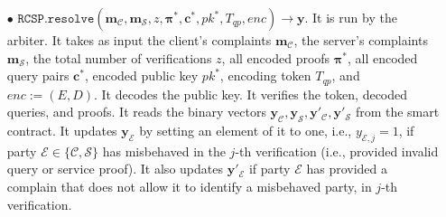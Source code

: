 \begin{definition}[RC-S-P Scheme]
\begin{itemize}

\


\item[$\bullet$] $\mathtt{RCSP}.\mathtt{resolve}(\bm{m}_{\scriptscriptstyle \mathcal{C}},\bm{m}_{\scriptscriptstyle \mathcal{S}},z, {\bm{\pi}}^{\scriptscriptstyle *}, {\bm{c}}^{\scriptscriptstyle *},pk^{\scriptscriptstyle*}, T_{\scriptscriptstyle qp},enc)\rightarrow \bm{y}$. It is run by the arbiter. It takes as input the client's complaints $\bm{m}_{\scriptscriptstyle \mathcal{C}}$, the server's complaints $\bm{m}_{\scriptscriptstyle \mathcal{S}}$, the total number of verifications $z$, all encoded proofs $ {\bm{\pi}}^{\scriptscriptstyle *}$, all encoded query pairs $ {\bm{c}}^{\scriptscriptstyle *}$, encoded public key $pk^{\scriptscriptstyle *}$, encoding token $T_{\scriptscriptstyle qp}$, and $enc:=(E,D)$. It decodes the public key. It verifies the token, decoded queries, and proofs.  It reads the  binary vectors $\bm{y}_{\scriptscriptstyle \mathcal  C}, \bm{y}_{\scriptscriptstyle \mathcal  S},\bm{y}'_{\scriptscriptstyle \mathcal  C}, \bm{y}'_{\scriptscriptstyle \mathcal  S}$ from the smart contract. It  updates $\bm{y}_{\scriptscriptstyle \mathcal E}$ by setting an element of it to one, i.e., $y_{\scriptscriptstyle \mathcal E,j}=1$, if party $\mathcal{E}\in\{\mathcal{C},\mathcal{S}\}$ has misbehaved in the $j$-th verification (i.e., provided invalid query or service proof). It also updates $\bm{y}'_{\scriptscriptstyle \mathcal E}$ if party $\mathcal{E}$ has provided a complain that does not allow it to identify a misbehaved party, in $j$-th verification. 




\end{itemize}
\end{definition}
